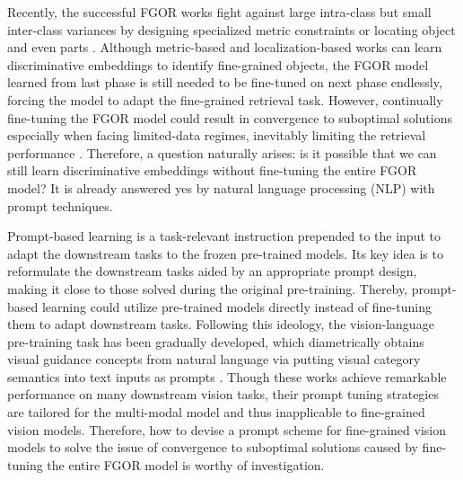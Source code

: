 \documentclass[letterpaper]{article} %
\begin{document}
Recently, the successful FGOR works fight against large intra-class but small inter-class variances by designing specialized metric constraints \cite{DBLP:conf/eccv/TehDT20,DBLP:conf/cvpr/WangHHDS19,DBLP:conf/eccv/BoudiafRZGPPA20} or locating object and even parts \cite{DBLP:journals/tip/WeiLWZ17,DBLP:conf/ijcai/ZhengJSWHY18,DBLP:conf/wacv/MoskvyakMDB21}. Although metric-based and localization-based works can learn discriminative embeddings to identify fine-grained objects, the FGOR model learned from last phase is still needed to be fine-tuned on next phase endlessly, forcing the model to adapt the fine-grained retrieval task. However, continually fine-tuning the FGOR model could result in convergence to suboptimal solutions especially when facing limited-data regimes, inevitably limiting the retrieval performance \cite{DBLP:conf/cvpr/HuangZGS21, DBLP:conf/icml/ZintgrafSKHW19}. Therefore, a question naturally arises: is it possible that we can still learn discriminative embeddings without fine-tuning the entire FGOR model? It is already answered yes by natural language processing (NLP) with prompt techniques. 



Prompt-based learning \cite{DBLP:journals/corr/abs-2208-10159} is a task-relevant instruction prepended to the input to adapt the downstream tasks to the frozen pre-trained models.
Its key idea is to reformulate the downstream tasks aided by an appropriate prompt design, making it close to those solved during the original pre-training.
Thereby, prompt-based learning could utilize pre-trained models directly instead of fine-tuning them to adapt downstream tasks.
Following this ideology, the vision-language pre-training task has been gradually developed, which diametrically obtains visual guidance concepts from natural language via putting visual category semantics into text inputs as prompts \cite{DBLP:conf/icml/JiaYXCPPLSLD21, DBLP:conf/iccv/KamathSLSMC21, DBLP:conf/icml/RadfordKHRGASAM21}.
Though these works achieve remarkable performance on many downstream vision tasks, their prompt tuning strategies are tailored for the multi-modal model and thus inapplicable to fine-grained vision models. Therefore, how to devise a prompt scheme for fine-grained vision models to solve the issue  of convergence to suboptimal solutions caused by fine-tuning the entire FGOR model is worthy of investigation. 
\end{document}
